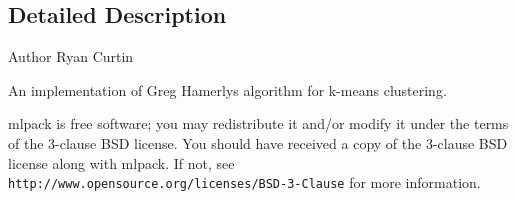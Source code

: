 \subsection{Detailed Description}
\begin{DoxyAuthor}{Author}
Ryan Curtin
\end{DoxyAuthor}
An implementation of Greg Hamerly\textquotesingle{}s algorithm for k-\/means clustering.

mlpack is free software; you may redistribute it and/or modify it under the terms of the 3-\/clause B\+SD license. You should have received a copy of the 3-\/clause B\+SD license along with mlpack. If not, see {\tt http\+://www.\+opensource.\+org/licenses/\+B\+S\+D-\/3-\/\+Clause} for more information. 